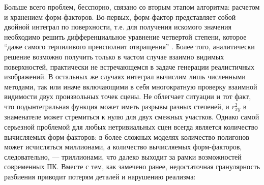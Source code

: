 \documentclass[12pt]{article}
\begin{document}
Больше всего проблем, бесспорно, связано со вторым этапом алгоритма: расчетом и хранением форм-факторов. Во-первых, форм-фактор представляет собой двойной интеграл по поверхности, т.е. для получения искомого значения необходимо решить дифференциальное уравнение четвертой степени, которое  ``даже самого терпиливого преисполнит отвращения'' \cite{Sch93}. Более того, аналитически решение возможно получить только в частом случае взаимно видимых поверхностей, практически не встречающемся в задаче генерации реалистичных изображений. В остальных же случаях интеграл вычислим лишь численными методами, так или иначе включающими в себя многократную проверку взаимной видимости двух произвольных точек сцены. Не облегчает ситуации и тот факт, что подынтегральная функция может иметь разрывы разных степеней, и $r_{xy}^2$ в знаменателе может стремиться к нулю для двух смежных участков. Однако самой серьезной проблемой для любых нетривиальных сцен всегда является количество вычисляемых форм-факторов: в более сложных моделях количество полигонов может исчисляться миллионами, а количество вычисляемых форм-факторов, следовательно, --- триллионами, что далеко выходит за рамки возможностей современных ПК. Вместе с тем, как замечено ранее, недостаточная гранулярность разбиения приводит потерям деталей и нарушению реализма:
\end{document}
